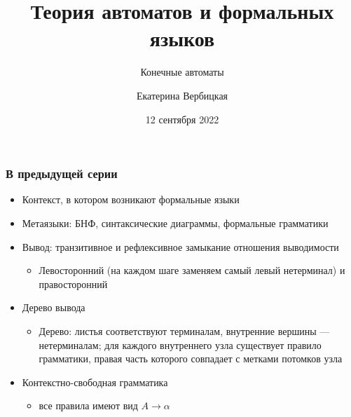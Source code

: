 \documentclass{beamer}
\title[]{Теория автоматов и формальных языков}
\subtitle[]{Конечные автоматы}
\institute[]{НИУ-ВШЭ}
\author[]{Екатерина Вербицкая}
\date{12 сентября 2022}
\begin{document}
{
  \begin{frame}
    \titlepage
  \end{frame}
}

\begin{frame}[fragile]
  \transwipe[direction=90]
  \frametitle{В предыдущей серии}
  \begin{itemize}
    \item Контекст, в котором возникают формальные языки
    \item Метаязыки: БНФ, синтаксические диаграммы, формальные грамматики
   \item Вывод: транзитивное и рефлексивное замыкание отношения выводимости
   \begin{itemize}
     \item Левосторонний (на каждом шаге заменяем самый левый нетерминал) и правосторонний
   \end{itemize}
   \item Дерево вывода
   \begin{itemize}
     \item Дерево: листья соответствуют терминалам, внутренние вершины --- нетерминалам; для каждого внутреннего узла существует правило грамматики, правая часть которого совпадает с метками потомков узла
   \end{itemize}
    \item  Контекстно-свободная грамматика
      \begin{itemize}
        \item все правила имеют вид $A \to \alpha$

      \end{itemize}

      \end{itemize}

\end{frame}
\end{document}
